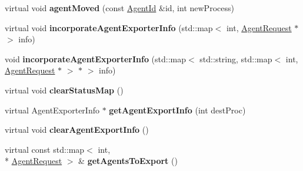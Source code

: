 \begin{DoxyCompactItemize}
\item 
\hypertarget{classrepast_1_1_importer_exporter___b_y___s_e_t_a0c56fa3b5c3d45b2c641419052182da0}{virtual void {\bfseries agent\-Moved} (const \hyperlink{classrepast_1_1_agent_id}{Agent\-Id} \&id, int new\-Process)}\label{classrepast_1_1_importer_exporter___b_y___s_e_t_a0c56fa3b5c3d45b2c641419052182da0}

\item 
\hypertarget{classrepast_1_1_importer_exporter___b_y___s_e_t_a45f53a2b8cbed32a994ef44fcb707728}{virtual void {\bfseries incorporate\-Agent\-Exporter\-Info} (std\-::map$<$ int, \hyperlink{classrepast_1_1_agent_request}{Agent\-Request} $\ast$ $>$ info)}\label{classrepast_1_1_importer_exporter___b_y___s_e_t_a45f53a2b8cbed32a994ef44fcb707728}

\item 
\hypertarget{classrepast_1_1_importer_exporter___b_y___s_e_t_abab0db9ba254d5ea5fe0db6b87a7d3d7}{void {\bfseries incorporate\-Agent\-Exporter\-Info} (std\-::map$<$ std\-::string, std\-::map$<$ int, \hyperlink{classrepast_1_1_agent_request}{Agent\-Request} $\ast$ $>$ $\ast$ $>$ info)}\label{classrepast_1_1_importer_exporter___b_y___s_e_t_abab0db9ba254d5ea5fe0db6b87a7d3d7}

\item 
\hypertarget{classrepast_1_1_importer_exporter___b_y___s_e_t_ab07661092d59b852fba56e10fa5b49d7}{virtual void {\bfseries clear\-Status\-Map} ()}\label{classrepast_1_1_importer_exporter___b_y___s_e_t_ab07661092d59b852fba56e10fa5b49d7}

\item 
\hypertarget{classrepast_1_1_importer_exporter___b_y___s_e_t_a9ba508377a9cd6b8a5f70c0634fd086c}{virtual Agent\-Exporter\-Info $\ast$ {\bfseries get\-Agent\-Export\-Info} (int dest\-Proc)}\label{classrepast_1_1_importer_exporter___b_y___s_e_t_a9ba508377a9cd6b8a5f70c0634fd086c}

\item 
\hypertarget{classrepast_1_1_importer_exporter___b_y___s_e_t_ad6d9611812f2b0872152126bff36f8cf}{virtual void {\bfseries clear\-Agent\-Export\-Info} ()}\label{classrepast_1_1_importer_exporter___b_y___s_e_t_ad6d9611812f2b0872152126bff36f8cf}

\item 
\hypertarget{classrepast_1_1_importer_exporter___b_y___s_e_t_a49fdc6cf040166d79cd75a06c8a9f77c}{virtual const std\-::map$<$ int, \\*
\hyperlink{classrepast_1_1_agent_request}{Agent\-Request} $>$ \& {\bfseries get\-Agents\-To\-Export} ()}\label{classrepast_1_1_importer_exporter___b_y___s_e_t_a49fdc6cf040166d79cd75a06c8a9f77c}


\end{DoxyCompactItemize}
